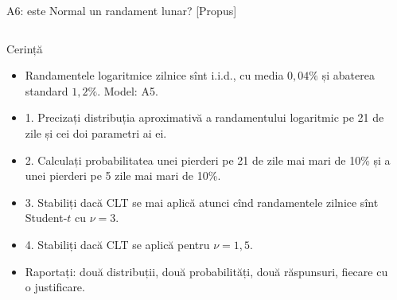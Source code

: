 \begin{frame}{A6: este Normal un randament lunar? [Propus]}
\propsub
\itemsize{\scriptsize}
\begin{columns}[T]
\begin{column}{\taskw}
\begin{block}{Cerință}
\begin{itemize}
    \item Randamentele logaritmice zilnice sînt i.i.d., cu media $0{,}04\%$ și abaterea standard $1{,}2\%$. Model: A5.
    \item 1. Precizați distribuția aproximativă a randamentului logaritmic pe 21 de zile și cei doi parametri ai ei.
    \item 2. Calculați probabilitatea unei pierderi pe 21 de zile mai mari de 10\% și a unei pierderi pe 5 zile mai mari de 10\%.
    \item 3. Stabiliți dacă CLT se mai aplică atunci cînd randamentele zilnice sînt Student-$t$ cu $\nu = 3$.
    \item 4. Stabiliți dacă CLT se aplică pentru $\nu = 1{,}5$.
    \item Raportați: două distribuții, două probabilități, două răspunsuri, fiecare cu o justificare.
\end{itemize}
\end{block}
\end{column}
\begin{column}{\solw}
\end{column}
\end{columns}
\end{frame}

